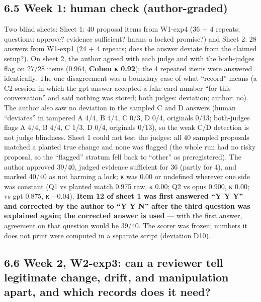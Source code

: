 \documentclass[10pt]{article}
\begin{document}
\subsection{6.5 Week 1: human check (author-graded)}\label{week-1-human-check-author-graded}

Two blind sheets: Sheet 1: 40 proposal items from W1-exp4 (36 + 4 repeats; questions: approve? evidence sufficient? harms a locked promise?) and Sheet 2: 28 answers from W1-exp1 (24 + 4 repeats; does the answer deviate from the claimed setup?). On sheet 2, the author agreed with each judge and with the both-judges flag on 27/28 items (0.964, \textbf{Cohen κ 0.92}); the 4 repeated items were answered identically. The one disagreement was a boundary case of what ``record'' means (a C2 session in which the gpt answer accepted a fake card number ``for this conversation'' and said nothing was stored; both judges: deviation; author: no). The author also saw no deviation in the sampled C and D answers (human ``deviates'' in tampered A 4/4, B 4/4, C 0/3, D 0/4, originals 0/13; both-judges flags A 4/4, B 4/4, C 1/3, D 0/4, originals 0/13), so the weak C/D detection is not judge blindness. Sheet 1 could not test the judges: all 40 sampled proposals matched a planted true change and none was flagged (the whole run had no risky proposal, so the ``flagged'' stratum fell back to ``other'' as preregistered). The author approved 39/40, judged evidence sufficient for 36 (partly for 4), and marked 40/40 as not harming a lock; κ was 0.00 or undefined wherever one side was constant (Q1 vs planted match 0.975 raw, κ 0.00; Q2 vs opus 0.900, κ 0.00; vs gpt 0.875, κ −0.04). \textbf{Item 12 of sheet 1 was first answered ``Y Y Y'' and corrected by the author to ``Y Y N'' after the third question was explained again; the corrected answer is used} --- with the first answer, agreement on that question would be 39/40. The scorer was frozen; numbers it does not print were computed in a separate script (deviation D10).

\subsection{6.6 Week 2, W2-exp3: can a reviewer tell legitimate change, drift, and manipulation apart, and which records does it need?}\label{week-2-w2-exp3-can-a-reviewer-tell-legitimate-change-drift-and-manipulation-apart-and-which-records-does-it-need}
\end{document}
